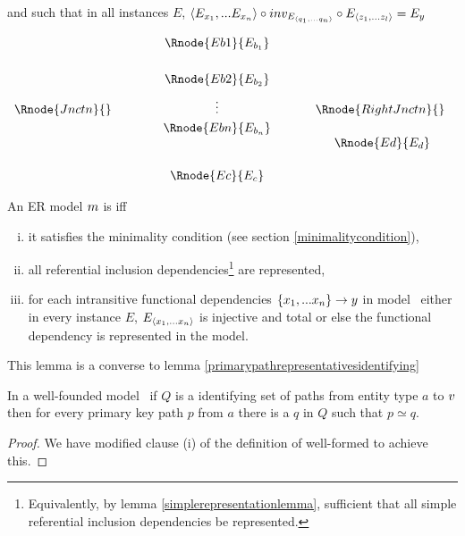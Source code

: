 \begin{definition}
and
such that in all instances $E$, 
$\langle E_{x_1},...E_{x_n}\rangle \circ inv_{E_{\langle q_1,...q_n\rangle}}\circ E_{\langle z_1,...z_l\rangle} = E_y$
\begin{center}
$
\begin{array}{cp{0.75cm}cp{0.55cm}c}
               &&\Rnode{Eb1}{E_{b_1}}   &&                      \\ [0.6cm]
               &&\Rnode{Eb2}{E_{b_2}}   &&                      \\ [0.2cm]
\Rnode{Jnctn}{}&&  \vdots               &&\Rnode{RightJnctn}{}  \\ [0.1cm]							
               &&\Rnode{Ebn}{E_{b_n}}   &&                      \\ [0cm]
							 &&                       &&\mbox{ }\Rnode{Ed}{E_d}       \\ [0.5cm]
               &&\Rnode{Ec}{{E_c}}      &&                      \\
\end{array}
$
\end{center} 
\end{definition}
 
\begin{definition}
\noindent An ER model ${m}$ is  
 iff 
\begin{enumerate} [(i)]
\item{
it satisfies the minimality condition (see section \ref{minimalitycondition}),
}
\item{ 
all referential inclusion dependencies\footnote{Equivalently, by lemma
\ref{simplerepresentationlemma}, sufficient that all simple referential inclusion dependencies be represented.} are  represented,
}
\item{
for each intransitive functional dependencies $\{x_1,...x_n\} \rightarrow y$ in model \genericmodel\
either in every instance $E$, $E_{\langle x_1,...x_n\rangle}$ is injective and total
or else the functional dependency is represented in the model.
}
\end{enumerate}
\end{definition}

This lemma is a converse to lemma \ref{primarypathrepresentativesidentifying}
\begin{lemma} 
\label{identifyingconverse}
In a well-founded model \genericmodel\ if $Q$ is a identifying set of paths from entity type $a$ to $v$
then for every primary key path $p$ from $a$ there is a $q$ in $Q$ such that $p \simeq q$.
\end{lemma}
\begin{proof}
We have modified clause (i) of the definition of well-formed to achieve this.
\end{proof}


